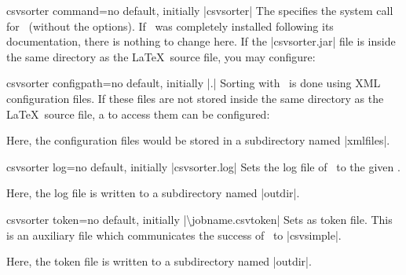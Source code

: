 \documentclass[a4paper,11pt]{ltxdoc}
\begin{document}
\bigskip

\begin{docCsvKey}{csvsorter command}{=}{no default, initially |csvsorter|}
  The  specifies the system call for \csvsorter\ (without the options).
  If \csvsorter\ was completely installed following its documentation, there is
  nothing to change here. If the |csvsorter.jar| file is inside the same
  directory as the \LaTeX\ source file, you may configure:%
\begin{dispListing}
\end{dispListing}
\end{docCsvKey}

\begin{docCsvKey}{csvsorter configpath}{=}{no default, initially |.|}
  Sorting with \csvsorter\ is done using XML configuration files. If these files
  are not stored inside the same directory as the \LaTeX\ source file, a
   to access them can be configured:
\begin{dispListing}
\end{dispListing}
  Here, the configuration files would be stored in a subdirectory named |xmlfiles|.
\end{docCsvKey}

\begin{docCsvKey}{csvsorter log}{=}{no default, initially |csvsorter.log|}
  Sets the log file of \csvsorter\ to the given .
\begin{dispListing}
\end{dispListing}
  Here, the log file is written to a subdirectory named |outdir|.
\end{docCsvKey}

\clearpage
\begin{docCsvKey}{csvsorter token}{=}{no default, initially |\textbackslash jobname.csvtoken|}
  Sets  as token file. This is an auxiliary file which
  communicates the success of \csvsorter\ to |csvsimple|.
\begin{dispListing}
\end{dispListing}
  Here, the token file is written to a subdirectory named |outdir|.
\end{docCsvKey}
\end{document}
